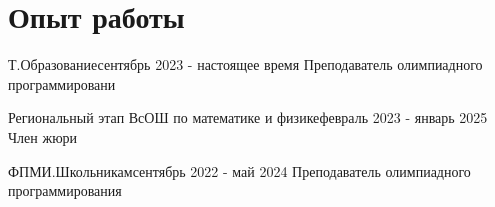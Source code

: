 \section{\textbf{Опыт работы}}
\resumeSubHeadingListStart

\resumeSubHeading
{Т.Образование}{сентябрь 2023 - настоящее время}
{Преподаватель олимпиадного программировани}

\resumeSubHeading
{Региональный этап ВсОШ по математике и физике}{февраль 2023 - январь 2025}
{Член жюри}

\resumeSubHeading
{ФПМИ.Школьникам}{сентябрь 2022 - май   2024}
{Преподаватель олимпиадного программирования}

\resumeSubHeadingListEnd
